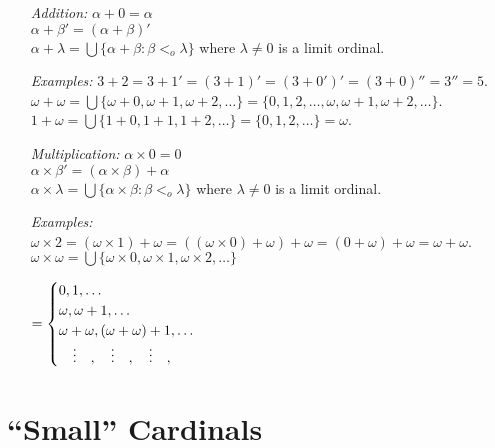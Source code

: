 \documentclass[a4paper, 11pt]{article} %
\newcommand{\set}[1]{\lbrace#1\rbrace} %
\begin{document}
\begin{itemize}
  \item[\it Addition:] 
    $\alpha + 0 = \alpha$\\ 
    $\alpha + \beta' = (\alpha + \beta)'$\\ 
    $\alpha + \lambda = \bigcup \set{ \alpha + \beta : \beta <_o \lambda }$ where $\lambda\neq 0$ is a limit ordinal.
  \item[\it Examples:]
    $3 + 2 = 3 + 1' = (3 + 1)' = (3 + 0')' = (3 + 0)'' = 3'' = 5$.\\
    $\omega + \omega = \bigcup \set{ \omega + 0, \omega + 1, \omega +2, \ldots } = \set{ 0, 1, 2, \ldots, \omega, \omega +1, \omega + 2, \ldots }$.\\
    $1 + \omega = \bigcup \set{ 1 + 0, 1 + 1, 1 + 2, \ldots } = \set{ 0, 1, 2, \ldots } = \omega$.
  \item[\it Multiplication:] 
    $\alpha \times 0 = 0$\\ 
    $\alpha \times \beta' = (\alpha \times \beta) + \alpha$\\ 
    $\alpha \times \lambda = \bigcup \set{ \alpha \times \beta : \beta <_o \lambda }$ where $\lambda\neq 0$ is a limit ordinal.
  \item[\it Examples:] 
    $\omega \times 2 = (\omega \times 1) + \omega = ((\omega \times 0) + \omega) + \omega = (0 + \omega) + \omega = \omega + \omega$.\\
    $\omega \times \omega = \bigcup \set{ \omega \times 0, \omega \times 1, \omega \times 2, \ldots }$\\
    \strut\hspace{.42in} $= 
      \begin{cases}
        0,1,\ldots\\
        \omega, \omega + 1,\ldots\\
        \omega + \omega, (\omega + \omega) +1, \ldots\\
        \strut\quad\vdots\quad, \quad\vdots\quad, \quad\vdots\quad, 
      \end{cases}$
\end{itemize}




\section*{``Small'' Cardinals}
\end{document}
